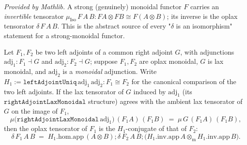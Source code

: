 \begin{lemma}
  \label{lem:functor_monoidal_muiso}
  \mathlibok
  \textit{Provided by Mathlib.}
  A strong (genuinely) monoidal functor \(F\) carries an \emph{invertible} tensorator
  \(\mu_{\mathrm{Iso}}\,F\,A\,B : F A \otimes F B \cong F(A \otimes B)\); its inverse is the oplax
  tensorator \(\delta\,F\,A\,B\). This is the abstract source of every "\(\delta\) is an
  isomorphism" statement for a strong-monoidal functor.
\end{lemma}

\begin{lemma}
  \label{lem:deltaconjofmucomparison}
  Let \(F_1, F_2\) be two left adjoints of a common right adjoint \(G\), with adjunctions
  \(\mathrm{adj}_1 : F_1 \dashv G\) and \(\mathrm{adj}_2 : F_2 \dashv G\); suppose \(F_1, F_2\) are
  oplax monoidal, \(G\) is lax monoidal, and \(\mathrm{adj}_2\) is a \emph{monoidal} adjunction.
  Write \(H_1 := \mathtt{leftAdjointUniq}\,\mathrm{adj}_1\,\mathrm{adj}_2 : F_1 \cong F_2\) for the
  canonical comparison of the two left adjoints. If the lax tensorator of \(G\) induced by
  \(\mathrm{adj}_1\) (its \(\mathtt{rightAdjointLaxMonoidal}\) structure) agrees with the ambient
  lax tensorator of \(G\) on the image of \(F_1\),
  \[
    \mu\bigl(\mathtt{rightAdjointLaxMonoidal}\,\mathrm{adj}_1\bigr)\,(F_1 A)\,(F_1 B)
      \;=\; \mu\,G\,(F_1 A)\,(F_1 B),
  \]
  then the oplax tensorator of \(F_1\) is the \(H_1\)-conjugate of that of \(F_2\):
  \[
    \delta\,F_1\,A\,B
      \;=\; H_1.\mathrm{hom}.\mathrm{app}\,(A \otimes B)
        \mathbin{;} \delta\,F_2\,A\,B
        \mathbin{;} \bigl(H_1.\mathrm{inv}.\mathrm{app}\,A \otimes_{\mathrm m}
          H_1.\mathrm{inv}.\mathrm{app}\,B\bigr).
  \]
\end{lemma}
